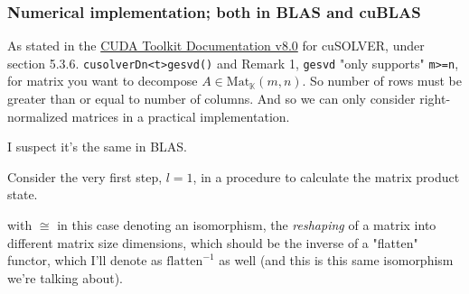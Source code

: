 \documentclass[10pt]{amsart}
\begin{document}
\begin{multicols*}{2}


\subsubsection{Numerical implementation; both in BLAS and cuBLAS}

As stated in the \href{http://docs.nvidia.com/cuda/cusolver/index.html#cuds-lt-t-gt-gesvd}{CUDA Toolkit Documentation v8.0} for cuSOLVER, under section 5.3.6. \verb|cusolverDn<t>gesvd()| and Remark 1, \verb|gesvd| "only supports" \verb|m>=n|, for matrix you want to decompose $A\in \text{Mat}_{\mathbb{K}}(m,n)$.  So number of rows must be greater than or equal to number of columns.  And so we can only consider right-normalized matrices in a practical implementation.  

I suspect it's the same in BLAS.  

Consider the very first step, $l=1$, in a procedure to calculate the matrix product state.  

with $\cong$ in this case denoting an isomorphism, the \emph{reshaping} of a matrix into different matrix size dimensions, which should be the inverse of a "flatten" functor, which I'll denote as $\text{flatten}^{-1}$ as well (and this is this same isomorphism we're talking about).  


\end{multicols*}
\end{document}
